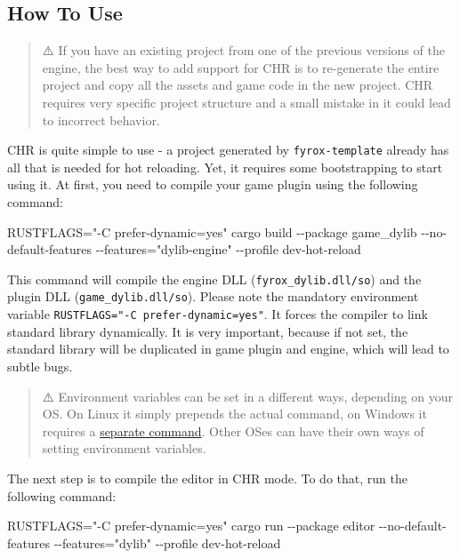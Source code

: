 \documentclass[
]{book}
\newenvironment{Shaded}{\begin{snugshade}}{\end{snugshade}}
\newcommand{\NormalTok}[1]{#1}
\theoremstyle{definition}
\theoremstyle{definition}
\theoremstyle{definition}
\theoremstyle{definition}
\theoremstyle{remark}
\begin{document}
\subsection{How To Use}\label{how-to-use}

\begin{quote}
⚠️ If you have an existing project from one of the previous versions of the engine, the best way to add support for
CHR is to re-generate the entire project and copy all the assets and game code in the new project. CHR requires very
specific project structure and a small mistake in it could lead to incorrect behavior.
\end{quote}

CHR is quite simple to use - a project generated by \texttt{fyrox-template} already has all that is needed for hot reloading. Yet, it requires some bootstrapping to start using it. At first, you need to compile your game plugin using the following command:

\begin{Shaded}
\begin{Highlighting}[]
\NormalTok{RUSTFLAGS="{-}C prefer{-}dynamic=yes" cargo build {-}{-}package game\_dylib {-}{-}no{-}default{-}features {-}{-}features="dylib{-}engine" {-}{-}profile dev{-}hot{-}reload}
\end{Highlighting}
\end{Shaded}

This command will compile the engine DLL (\texttt{fyrox\_dylib.dll/so}) and the plugin DLL (\texttt{game\_dylib.dll/so}). Please note the mandatory environment variable \texttt{RUSTFLAGS="-C\ prefer-dynamic=yes"}. It forces the compiler to link standard library dynamically. It is very important, because if not set, the standard library will be duplicated in game plugin and engine, which will lead to subtle bugs.

\begin{quote}
⚠️ Environment variables can be set in a different ways, depending on your OS. On Linux it simply prepends the actual
command, on Windows it requires a \href{https://learn.microsoft.com/en-us/windows-server/administration/windows-commands/set_1\#examples}{separate command}.
Other OSes can have their own ways of setting environment variables.
\end{quote}

The next step is to compile the editor in CHR mode. To do that, run the following command:

\begin{Shaded}
\begin{Highlighting}[]
\NormalTok{RUSTFLAGS="{-}C prefer{-}dynamic=yes" cargo run {-}{-}package editor {-}{-}no{-}default{-}features {-}{-}features="dylib" {-}{-}profile dev{-}hot{-}reload}
\end{Highlighting}
\end{Shaded}
\end{document}
